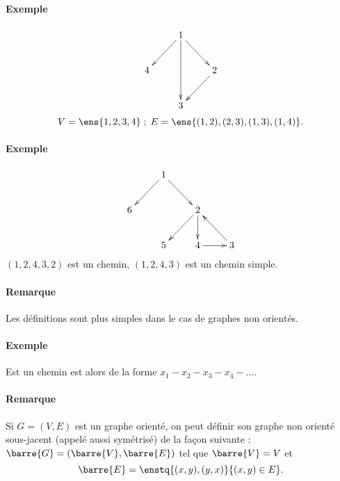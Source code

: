 \documentclass{mybourbaki}
\begin{document}
\paragraph{Exemple}
\[ \xymatrix{ 
 & 1 \ar[ld]\ar[dd]\ar[rd]\\
 4 & & 2 \ar[ld]\\
  & 3
}\]
\[ V = \ens{1,2,3,4} \; ; \;  E = \ens{(1,2),(2,3),(1,3),(1,4)}.\]


\paragraph{Exemple}
\[ \xymatrix{
 & 1\ar[ld] \ar[rd] \\
 6 & &2\ar[ld]\ar[d] \\
 & 5 & 4\ar[r] & 3 \ar[lu] 
}\]
$(1,2,4,3,2)$ est un chemin, $(1,2,4,3)$ est un chemin simple.


\paragraph{Remarque}Les définitions sont plus simples dans le cas de graphes non orientés. 
\paragraph{Exemple}Est un chemin est alors de la forme $x_1- x_2-x_3-x_4-\ldots$.

\paragraph{Remarque}Si $G=(V,E)$ est un graphe orienté, on peut définir son graphe non orienté sous-jacent (appelé aussi symétrisé) de la façon suivante : $\barre{G} = (\barre{V},\barre{E})$ tel que $\barre{V}=V$ et $$\barre{E} = \enstq{(x,y),(y,x)}{(x,y)\in E}.$$
\end{document}
